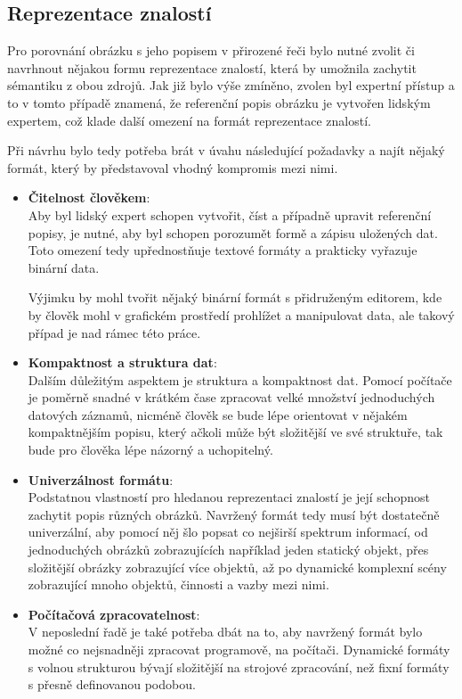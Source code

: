 \subsection{Reprezentace znalostí}\label{subsec:reprezentace_znalosti}
Pro porovnání obrázku s jeho popisem v přirozené řeči bylo nutné zvolit či navrhnout nějakou formu reprezentace znalostí,
která by umožnila zachytit sémantiku z obou zdrojů.
Jak již bylo výše zmíněno, zvolen byl expertní přístup a to v tomto případě znamená, že referenční popis obrázku je vytvořen lidským expertem,
což klade další omezení na formát reprezentace znalostí.

Při návrhu bylo tedy potřeba brát v úvahu následující požadavky a najít nějaký formát, který by představoval vhodný kompromis mezi nimi.
\begin{itemize}
	\item \textbf{Čitelnost člověkem}:\\
	      Aby byl lidský expert schopen vytvořit, číst a případně upravit referenční popisy,
	      je nutné, aby byl schopen porozumět formě a zápisu uložených dat.
	      Toto omezení tedy upřednostňuje textové formáty a prakticky vyřazuje binární data.

	      Výjimku by mohl tvořit nějaký binární formát s přidruženým editorem,
	      kde by člověk mohl v grafickém prostředí prohlížet a manipulovat data, ale takový případ je nad rámec této práce.
	\item \textbf{Kompaktnost a struktura dat}:\\
	      Dalším důležitým aspektem je struktura a kompaktnost dat.
	      Pomocí počítače je poměrně snadné v krátkém čase zpracovat velké množství jednoduchých datových záznamů,
	      nicméně člověk se bude lépe orientovat v nějakém kompaktnějším popisu, který ačkoli může být složitější ve své struktuře,
	      tak bude pro člověka lépe názorný a uchopitelný.
	\item \textbf{Univerzálnost formátu}:\\
	      Podstatnou vlastností pro hledanou reprezentaci znalostí je její schopnost zachytit popis různých obrázků.
	      Navržený formát tedy musí být dostatečně univerzální, aby pomocí něj šlo popsat co nejširší spektrum informací,
	      od jednoduchých obrázků zobrazujících například jeden statický objekt, přes složitější obrázky zobrazující více objektů,
	      až po dynamické komplexní scény zobrazující mnoho objektů, činnosti a vazby mezi nimi.
	\item \textbf{Počítačová zpracovatelnost}:\\
	      V neposlední řadě je také potřeba dbát na to, aby navržený formát bylo možné co nejsnadněji zpracovat programově, na počítači.
	      Dynamické formáty s volnou strukturou bývají složitější na strojové zpracování, než fixní formáty s přesně definovanou podobou.
\end{itemize}

